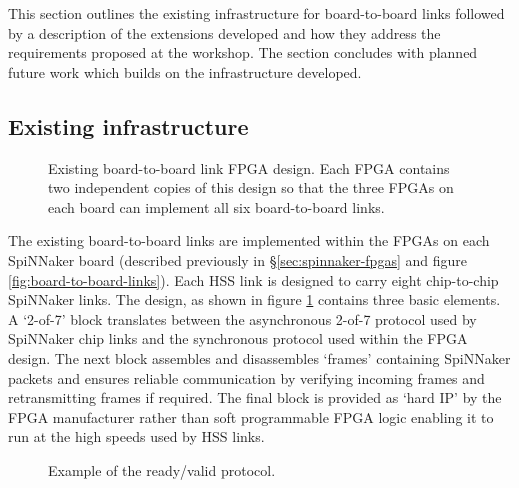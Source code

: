 		This section outlines the existing infrastructure for board-to-board links
		followed by a description of the extensions developed and how they address
		the requirements proposed at the workshop. The section concludes with
		planned future work which builds on the infrastructure developed.
		
			\subsection{Existing infrastructure}
				
				
				\begin{figure}
					\center
					
					
					\caption[Existing board-to-board link FPGA design.]{Existing
					board-to-board link FPGA design. Each FPGA contains two independent
					copies of this design so that the three FPGAs on each board can
					implement all six board-to-board links.}
					\label{fig:existing-fpga-links}
				\end{figure}
				
				The existing board-to-board links are implemented within the FPGAs on
				each SpiNNaker board (described previously in
				\S\ref{sec:spinnaker-fpgas} and figure \ref{fig:board-to-board-links}).
				Each HSS link is designed to carry eight chip-to-chip SpiNNaker links.
				The design, as shown in figure \ref{fig:existing-fpga-links} contains
				three basic elements. A `2-of-7' block translates between the
				asynchronous 2-of-7 protocol used by SpiNNaker chip links and the
				synchronous protocol used within the FPGA design. The next block
				assembles and disassembles `frames' containing SpiNNaker packets and
				ensures reliable communication by verifying incoming frames and
				retransmitting frames if required. The final block is provided as `hard
				IP' by the FPGA manufacturer rather than soft programmable FPGA logic
				enabling it to run at the high speeds used by HSS links.
				
				\begin{figure}
					\center
					\begin{tikzpicture}[thick]
						
					\end{tikzpicture}
					
					\caption{Example of the ready/valid protocol.}
					\label{fig:rdyvld-protocol}
				\end{figure}
				
